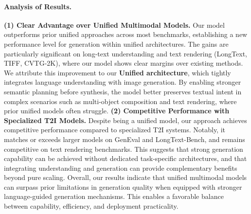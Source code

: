 \paragraph{Analysis of Results.} \textbf{(1) Clear Advantage over Unified Multimodal Models.}
Our model outperforms prior unified approaches across most benchmarks, establishing a new performance level for generation within unified architectures. The gains are particularly significant on long-text understanding and text rendering (LongText, TIFF, CVTG-2K), where our model shows clear margins over existing methods.
We attribute this improvement to our \textbf{Unified architecture}, which tightly integrates language understanding with image generation. By enabling stronger semantic planning before synthesis, the model better preserves textual intent in complex scenarios such as multi-object composition and text rendering, where prior unified models often struggle. \textbf{(2) Competitive Performance with Specialized T2I Models.}
Despite being a unified model, our approach achieves competitive performance compared to specialized T2I systems. Notably, it matches or exceeds larger models on GenEval and LongText-Bench, and remains competitive on text rendering benchmarks.
This suggests that strong generation capability can be achieved without dedicated task-specific architectures, and that integrating understanding and generation can provide complementary benefits beyond pure scaling. Overall, our results indicate that unified multimodal models can surpass prior limitations in generation quality when equipped with stronger language-guided generation mechanisms. This enables a favorable balance between capability, efficiency, and deployment practicality.



